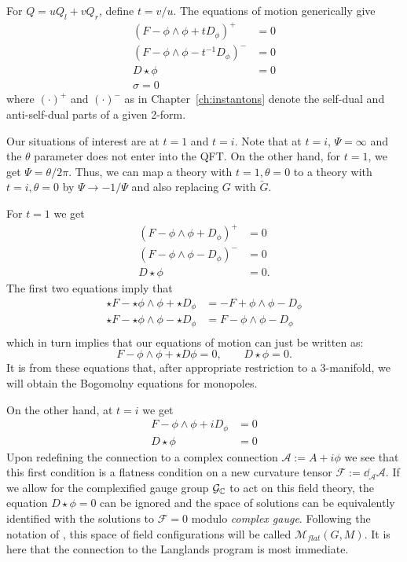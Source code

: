 	For $Q = u Q_l + v Q_r$, define $t = v/u$. The equations of motion generically give
	\begin{equation}
		\begin{aligned}
			(F - \phi \wedge \phi + t D_\phi)^+ &= 0\\
			(F - \phi \wedge \phi - t^{-1} D_\phi)^- &= 0\\
			D \star \phi &= 0\\
			\sigma = 0
		\end{aligned}
	\end{equation}
	where $(\cdot)^+$ and $(\cdot)^-$ as in Chapter~\ref{ch:instantons} denote the self-dual and anti-self-dual parts of a given 2-form. 
	
	Our situations of interest are at $t=1$ and $t=i$. Note that at $t = i$, $\Psi = \infty$ and the $\theta$ parameter does not enter into the QFT. On the other hand, for $t = 1$, we get $\Psi = \theta/2\pi$. Thus, we can map a theory with $t=1, \theta=0$ to a theory with $t = i, \theta = 0$ by $\Psi \to -1/\Psi$ and also replacing $G$ with $\check G$.
	
	For $t = 1$ we get
	\[
	\begin{aligned}
		(F - \phi \wedge \phi + D_\phi)^+ &= 0\\
		(F - \phi \wedge \phi - D_\phi)^- &= 0\\
		D \star \phi &= 0.
	\end{aligned}	
	\]
	The first  two equations imply that
	\[
	\begin{aligned}
		\star F - \star \phi \wedge \phi + \star D_\phi &= - F + \phi \wedge \phi - D_\phi\\
		\star F - \star \phi \wedge \phi - \star D_\phi &= F - \phi \wedge \phi - D_\phi\\
	\end{aligned}		
	\]
	which in turn implies that our equations of motion can just be written as:
	\begin{equation}
		F - \phi \wedge \phi + \star D \phi = 0, \qquad D \star \phi = 0.
	\end{equation}
	It is from these equations that, after appropriate restriction to a 3-manifold, we will obtain the Bogomolny equations for monopoles.
	
	
	On the other hand, at $t=i$ we get
	\[
	\begin{aligned}
		F - \phi \wedge \phi + i D_\phi &= 0\\
		D \star \phi &= 0
	\end{aligned}	
	\]
	Upon redefining the connection to a complex connection $\mathcal A := A + i \phi$ we see that this first condition is a flatness condition on a new curvature tensor $\mathcal F := \dd_{\mathcal A} \mathcal A$.  If we allow for the complexified gauge group $\mathcal G_{\mathbb{C}}$ to act on this field theory, the equation $D \star \phi = 0$ can be ignored and the space of solutions can be equivalently identified with the solutions to $\mathcal F = 0$ modulo \emph{complex gauge}. Following the notation of \cite{kapustin2008}, this space of field configurations will be called $\mathcal M_{flat}(G, M)$. It is here that the connection to the Langlands program is most immediate.
	
